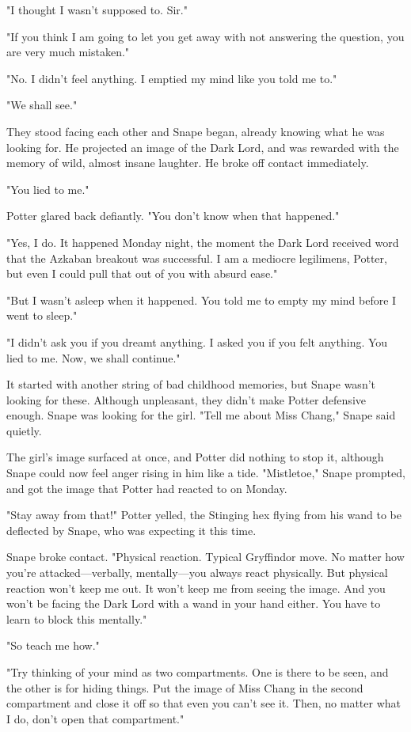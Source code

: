 "I thought I wasn't supposed to. Sir."

"If you think I am going to let you get away with not answering the question, you are very much mistaken."

"No. I didn't feel anything. I emptied my mind like you told me to."

"We shall see."

They stood facing each other and Snape began, already knowing what he was looking for. He projected an image of the Dark Lord, and was rewarded with the memory of wild, almost insane laughter. He broke off contact immediately.

"You lied to me."

Potter glared back defiantly. "You don't know when that happened."

"Yes, I do. It happened Monday night, the moment the Dark Lord received word that the Azkaban breakout was successful. I am a mediocre legilimens, Potter, but even I could pull that out of you with absurd ease."

"But I wasn't asleep when it happened. You told me to empty my mind before I went to sleep."

"I didn't ask you if you dreamt anything. I asked you if you felt anything. You lied to me. Now, we shall continue."

It started with another string of bad childhood memories, but Snape wasn't looking for these. Although unpleasant, they didn't make Potter defensive enough. Snape was looking for the girl. "Tell me about Miss Chang," Snape said quietly.

The girl's image surfaced at once, and Potter did nothing to stop it, although Snape could now feel anger rising in him like a tide. "Mistletoe," Snape prompted, and got the image that Potter had reacted to on Monday.

"Stay away from that!" Potter yelled, the Stinging hex flying from his wand to be deflected by Snape, who was expecting it this time.

Snape broke contact. "Physical reaction. Typical Gryffindor move. No matter how you're attacked—verbally, mentally—you always react physically. But physical reaction won't keep me out. It won't keep me from seeing the image. And you won't be facing the Dark Lord with a wand in your hand either. You have to learn to block this mentally."

"So teach me how."

"Try thinking of your mind as two compartments. One is there to be seen, and the other is for hiding things. Put the image of Miss Chang in the second compartment and close it off so that even you can't see it. Then, no matter what I do, don't open that compartment."

